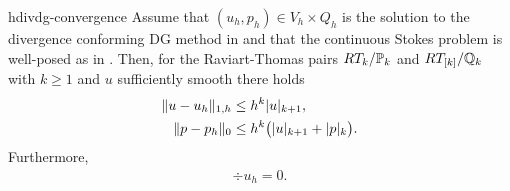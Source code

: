 \begin{Theorem}{hdivdg-convergence}
  Assume that $(u_h,p_h)\in V_h\times Q_h$ is the solution to the
  divergence conforming DG method in  and
  that the continuous Stokes problem is well-posed as in
  . Then, for the Raviart-Thomas
  pairs $RT_k/\P_k$ and $RT_{[k]}/\Q_k$ with $k\ge 1$ and
  $u$ sufficiently smooth there holds
  \begin{align}
    \label{eq:hdivdg:5}
    \norm{u-u_h}_{1,h} &\le h^k \snorm{u}_{k+1}, \\
    \label{eq:hdivdg:7}
    \norm{p-p_h}_{0} &\le h^k \bigl(\snorm{u}_{k+1} + \snorm{p}_{k}\bigr).
  \end{align}
  Furthermore,
  \begin{gather}
    \label{eq:hdivdg:6}
    \div u_h = 0.
  \end{gather}
\end{Theorem}

